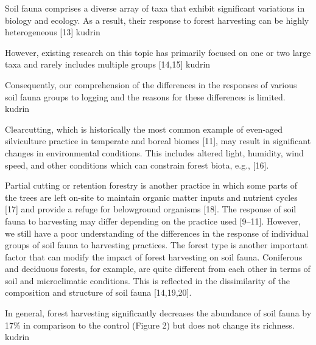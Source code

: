 

Soil fauna comprises a diverse array of taxa that exhibit significant variations in biology and ecology. As a result, their response to forest harvesting can be highly heterogeneous [13] kudrin

However, existing research on this topic has primarily focused on one or two large taxa and rarely includes multiple groups [14,15] kudrin

Consequently, our comprehension of the differences in the responses of various soil fauna groups to logging and the reasons for these differences is limited. kudrin

Clearcutting, which is historically the most common example of even-aged silviculture practice in temperate and boreal biomes [11], may result in significant changes in environmental conditions. This includes altered light, humidity, wind speed, and other conditions which can constrain forest biota, e.g., [16].

Partial cutting or retention forestry is another practice in which some parts of the trees are left on-site to maintain organic matter inputs and nutrient cycles [17] and provide a refuge for belowground organisms [18]. The response of soil fauna to harvesting may differ depending on the practice used [9–11]. However, we still have a poor understanding of the differences in the response of individual groups of soil fauna to harvesting practices. The forest type is another important factor that can modify the impact of forest harvesting on soil fauna. Coniferous and deciduous forests, for example, are quite different from each other in terms of soil and microclimatic conditions. This is reflected in the dissimilarity of the composition and structure of soil fauna [14,19,20].

In general, forest harvesting significantly decreases the abundance of soil fauna by 17\% in comparison to the control (Figure 2) but does not change its richness. kudrin

